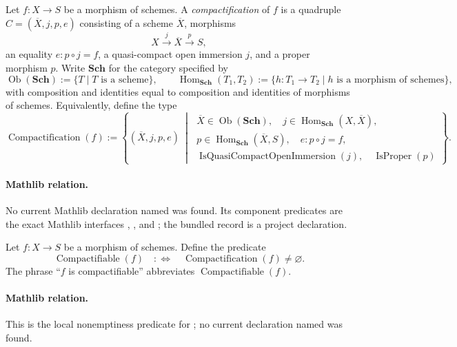 \begin{definition}[Compactification] \checked
  \label{def:nagata-compactification}

  Let $f\colon X\to S$ be a morphism of schemes.  A \emph{compactification}
  of $f$ is a quadruple $C=(\overline X,j,p,e)$ consisting of a scheme
  $\overline X$, morphisms
  \[
    X\xrightarrow{j}\overline X\xrightarrow{p}S,
  \]
  an equality $e\colon p\circ j=f$, a quasi-compact open immersion $j$, and
  a proper morphism $p$.
  Write $\mathbf{Sch}$ for the category specified by
  \[
    \operatorname{Ob}(\mathbf{Sch})
      :=\{T\mid T\text{ is a scheme}\},\qquad
    \operatorname{Hom}_{\mathbf{Sch}}(T_1,T_2)
      :=\{h\colon T_1\to T_2\mid h\text{ is a morphism of schemes}\},
  \]
  with composition and identities equal to composition and identities of
  morphisms of schemes.  Equivalently, define the type
  \[
    \operatorname{Compactification}(f)
      :=\left\{(\overline X,j,p,e)\ \middle|\;
      \begin{array}{l}
        \overline X\in\operatorname{Ob}(\mathbf{Sch}),\quad
        j\in\operatorname{Hom}_{\mathbf{Sch}}(X,\overline X),\\
        p\in\operatorname{Hom}_{\mathbf{Sch}}(\overline X,S),\quad
        e\colon p\circ j=f,\\
        \operatorname{IsQuasiCompactOpenImmersion}(j),\quad
        \operatorname{IsProper}(p)
      \end{array}\right\}.
  \]

  \paragraph{Mathlib relation.}
  No current Mathlib declaration named
  \texttt{} was found.  Its
  component predicates are the exact Mathlib interfaces
  \texttt{},
  \texttt{}, and
  \texttt{}; the bundled record is a project
  declaration.
\end{definition}

\begin{definition}[Compactifiability]
  \label{def:nagata-compactifiable}

  Let \(f\colon X\to S\) be a morphism of schemes.  Define the predicate
  \[
    \operatorname{Compactifiable}(f)
      \quad:\Longleftrightarrow\quad
    \operatorname{Compactification}(f)\neq\varnothing.
  \]
  The phrase ``$f$ is compactifiable'' abbreviates
  $\operatorname{Compactifiable}(f)$.

  \paragraph{Mathlib relation.}
  This is the local nonemptiness predicate for
  ; no current declaration named
  \texttt{} was found.
\end{definition}

